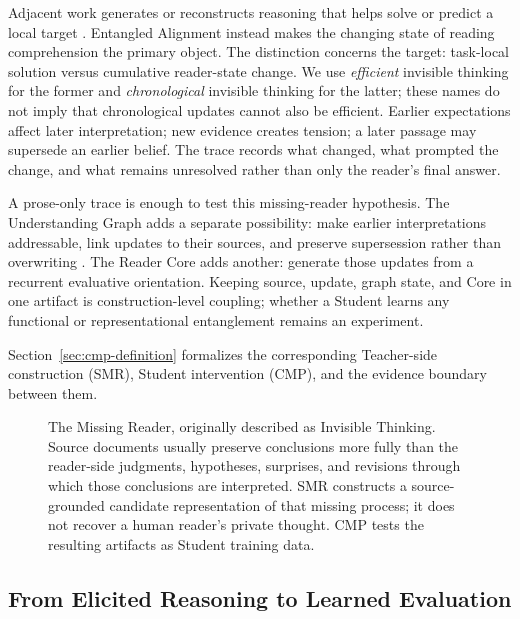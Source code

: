 \documentclass[11pt]{article}
\begin{document}
Adjacent work generates or reconstructs reasoning that helps solve or predict a
local target \cite{nye2021scratchpads,zelikman2022star,zelikman2024quietstar}.
Entangled Alignment instead makes the changing state of reading comprehension
the primary object. The distinction concerns the target: task-local solution versus cumulative
reader-state change. We use \emph{efficient} invisible thinking for the former
and \emph{chronological} invisible thinking for the latter; these names do not
imply that chronological updates cannot also be efficient. Earlier
expectations affect later interpretation; new evidence creates tension; a later
passage may supersede an earlier belief. The trace records what changed, what
prompted the change, and what remains unresolved rather than only the reader's
final answer.

A prose-only trace is enough to test this missing-reader hypothesis. The
Understanding Graph adds a separate possibility: make earlier interpretations
addressable, link updates to their sources, and preserve supersession rather
than overwriting \cite{westerberg2026understanding}. The Reader Core adds another:
generate those updates from a recurrent evaluative orientation. Keeping source,
update, graph state, and Core in one artifact is construction-level coupling;
whether a Student learns any functional or representational entanglement remains
an experiment.

Section~\ref{sec:cmp-definition} formalizes the corresponding Teacher-side
construction (SMR), Student intervention (CMP), and the evidence boundary between
them.

\begin{figure}[h]
    \centering
    \resizebox{0.985\textwidth}{!}{}
    \caption{The Missing Reader, originally described as Invisible Thinking. Source documents usually preserve conclusions more fully than the reader-side judgments, hypotheses, surprises, and revisions through which those conclusions are interpreted. SMR constructs a source-grounded candidate representation of that missing process; it does not recover a human reader's private thought. CMP tests the resulting artifacts as Student training data.}
    \label{fig:invisible-thinking}
\end{figure}

\subsection{From Elicited Reasoning to Learned Evaluation}
\label{sec:learned-evaluation}
\end{document}
